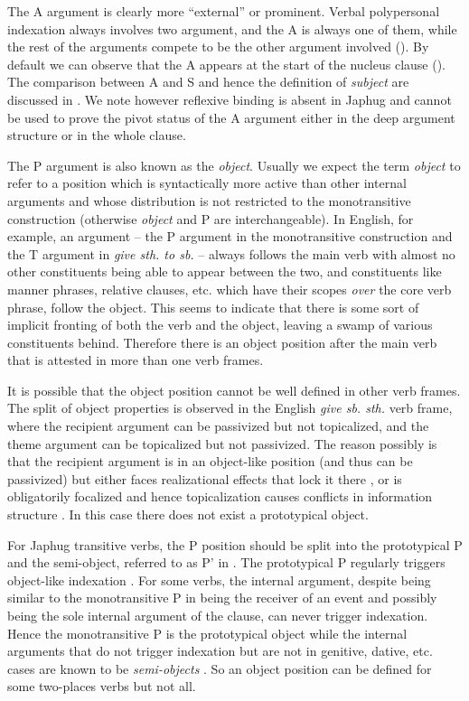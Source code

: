 \documentclass[a4paper, oneside, 12pt]{report}
\newcommand*{\citesec}[1]{\S~{#1}}
\newcommand*{\citepage}[1]{p.~{#1}}
\newcommand*{\term}[1]{\emph{#1}}
\newcommand{\form}[1]{\emph{#1}}
\begin{document}
The A argument is clearly more ``external'' or prominent.
Verbal polypersonal indexation always involves two argument,
and the A is always one of them, 
while the rest of the arguments compete to be the other argument involved 
().
By default we can observe that the A 
appears at the start of the nucleus clause 
().
The comparison between A and S and hence the definition of \term{subject}
are discussed in .
We note however reflexive binding is absent in Japhug
\citep[\citepage{543}]{jacques2021grammar}
and cannot be used to prove the pivot status of the A argument
either in the deep argument structure or in the whole clause.

The P argument is also known as the \term{object}.
Usually we expect the term \term{object} to refer to a position 
which is syntactically more active than other internal arguments
and whose distribution is not restricted to the monotransitive construction
(otherwise \term{object} and P are interchangeable).
In English, for example,
an argument -- the P argument in the monotransitive construction 
and the T argument in \form{give sth. to sb.} --
always follows the main verb with almost no other constituents
being able to appear between the two,
and constituents like manner phrases, relative clauses, etc.
which have their scopes \emph{over} the core verb phrase, follow the object.
This seems to indicate that there is some sort of implicit fronting 
of both the verb and the object,
leaving a swamp of various constituents behind.
Therefore there is an object position after the main verb
that is attested in more than one verb frames. 

It is possible that the object position cannot be well defined in other verb frames. 
The split of object properties is observed in the English \form{give sb. sth.} verb frame,
where the recipient argument can be passivized but not topicalized,
and the theme argument can be topicalized but not passivized.
The reason possibly is that the recipient argument is in an object-like position
(and thus can be passivized)
but either faces realizational effects that lock it there 
\citep{oba2005double},
or is obligatorily focalized and hence topicalization causes conflicts in information structure
\citep{im2005alternative}.
In this case there does not exist a prototypical object.

For Japhug transitive verbs, 
the P position should be split into the prototypical P
and the semi-object, referred to as P' in \citet{jacques2016subjects}.
The prototypical P regularly triggers object-like indexation
\citep[\citesec{8.1.3}, \citepage{543}]{jacques2021grammar}.
For some verbs, the internal argument,
despite being similar to the monotransitive P in being the receiver of an event 
and possibly being the sole internal argument of the clause,
can never trigger indexation.
Hence the monotransitive P is the prototypical object
while the internal arguments that do not trigger indexation 
but are not in genitive, dative, etc. cases
are known to be \term{semi-objects}
\citep[\citesec{8.1.5}]{jacques2021grammar}.
So an object position can be defined for some two-places verbs but not all.
\end{document}
